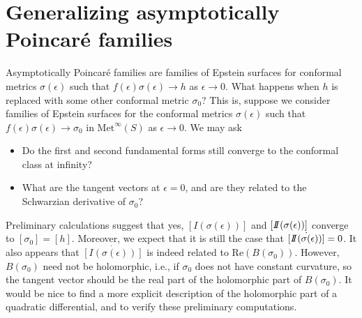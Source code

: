 \section{Generalizing asymptotically Poincar\'e families}

Asymptotically Poincar\'e families are families of Epstein surfaces for conformal metrics $\sigma(\epsilon)$ such that $f(\epsilon)\sigma(\epsilon) \to h$ as $\epsilon \to 0$.
What happens when $h$ is replaced with some other conformal metric $\sigma_0$?
This is, suppose we consider families of Epstein surfaces for the conformal metrics $\sigma(\epsilon)$ such that $f(\epsilon)\sigma(\epsilon) \to \sigma_0$ in $\mathrm{Met}^\infty(S)$ as $\epsilon \to 0$.
We may ask
\begin{itemize}
\item Do the first and second fundamental forms still converge to the conformal class at infinity? 
\item What are the tangent vectors at $\epsilon = 0$, and are they related to the Schwarzian derivative of $\sigma_0$? 
\end{itemize}

Preliminary calculations suggest that yes, $[I(\sigma(\epsilon))]$ and $[I\!\!I(\sigma(\epsilon))]$ converge to $[\sigma_0] = [h]$.
Moreover, we expect that it is still the case that $\dot{[I\!\!I(\sigma(\epsilon))]} = 0$.
It also appears that $\dot{[I(\sigma(\epsilon))]}$ is indeed related to $\mathrm{Re}(B(\sigma_0))$. 
However, $B(\sigma_0)$ need not be holomorphic, i.e., if $\sigma_0$ does not have constant curvature, so the tangent vector should be the real part of the holomorphic part of $B(\sigma_0)$. 
It would be nice to find a more explicit description of the holomorphic part of a quadratic differential, and to verify these preliminary computations.  

